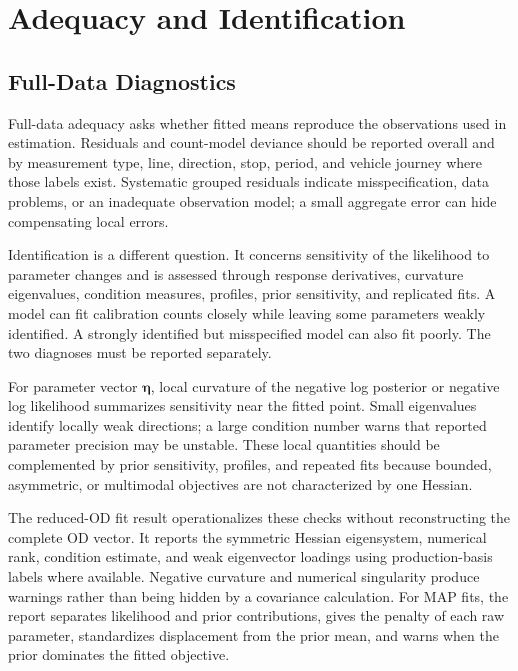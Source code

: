 
\section{Adequacy and Identification}
\subsection{Full-Data Diagnostics}

Full-data adequacy asks whether fitted means reproduce the observations used in
estimation. Residuals and count-model deviance should be reported overall and
by measurement type, line, direction, stop, period, and vehicle journey where
those labels exist. Systematic grouped residuals indicate misspecification,
data problems, or an inadequate observation model; a small aggregate error can
hide compensating local errors.

Identification is a different question. It concerns sensitivity of the
likelihood to parameter changes and is assessed through response derivatives,
curvature eigenvalues, condition measures, profiles, prior sensitivity, and
replicated fits. A model can fit calibration counts closely while leaving some
parameters weakly identified. A strongly identified but misspecified model can
also fit poorly. The two diagnoses must be reported separately.

For parameter vector $\bm\eta$, local curvature of the negative log posterior
or negative log likelihood summarizes sensitivity near the fitted point. Small
eigenvalues identify locally weak directions; a large condition number warns
that reported parameter precision may be unstable. These local quantities
should be complemented by prior sensitivity, profiles, and repeated fits
because bounded, asymmetric, or multimodal objectives are not characterized by
one Hessian.

The reduced-OD fit result operationalizes these checks without reconstructing
the complete OD vector. It reports the symmetric Hessian eigensystem, numerical
rank, condition estimate, and weak eigenvector loadings using production-basis
labels where available. Negative curvature and numerical singularity produce
warnings rather than being hidden by a covariance calculation. For MAP fits,
the report separates likelihood and prior contributions, gives the penalty of
each raw parameter, standardizes displacement from the prior mean, and warns
when the prior dominates the fitted objective.

